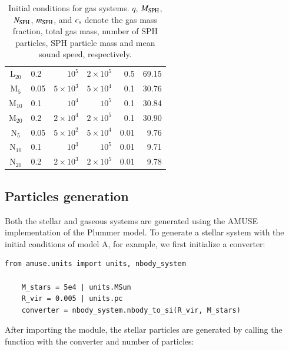 \begin{table}[!h]
\begin{tabular}{clrrrr}
		\rowcolor[gray]{0.9}
		L$_{20}$ & 0.2  & $10^5$  & $2 \times 10^5$  & 0.5 & 69.15 \\
		
		\rowcolor[gray]{1}
		M$_{5}$ & 0.05  & $5 \times 10^3$  & $5 \times 10^4$  & 0.1 & 30.76 \\
		
		\rowcolor[gray]{1}
		M$_{10}$ & 0.1  & $10^4$  & $10^5$  & 0.1 & 30.84 \\
		
		\rowcolor[gray]{1}
		M$_{20}$ & 0.2  & $2 \times 10^4$  & $2 \times 10^5$  & 0.1 & 30.90 \\
		
		\rowcolor[gray]{0.9}
		N$_{5}$ & 0.05  & $5 \times 10^2$  & $5 \times 10^4$  & 0.01 & 9.76 \\
		
		\rowcolor[gray]{0.9}
		N$_{10}$ & 0.1  & $10^3$  & $10^5$  & 0.01 & 9.71 \\
		
		\rowcolor[gray]{0.9}
		N$_{20}$ & 0.2  & $2 \times 10^3$  & $2 \times 10^5$  & 0.01 & 9.78 \\
	\end{tabular}
	\caption{Initial conditions for gas systems. $q$, $M_{\rm SPH}$, $N_{\rm SPH}$, $m_{\rm SPH}$, and $c_{\rm s}$ denote the gas mass fraction, total gas mass, number of SPH particles, SPH particle mass and mean sound speed, respectively.}
	\label{tab:4.1_models_IC_gas}
\end{table}

\subsection{Particles generation}

Both the stellar and gaseous systems are generated using the AMUSE implementation of the Plummer model. To generate a stellar system with the initial conditions of model A, for example, we first initialize a converter:

\begin{lstlisting}[caption=Converter example for model A, label=lst:conv_model_A]
	from amuse.units import units, nbody_system
	
	M_stars = 5e4 | units.MSun
	R_vir = 0.005 | units.pc
	converter = nbody_system.nbody_to_si(R_vir, M_stars)
\end{lstlisting}

After importing the  module, the stellar particles are generated by calling the function  with the converter and number of particles:

